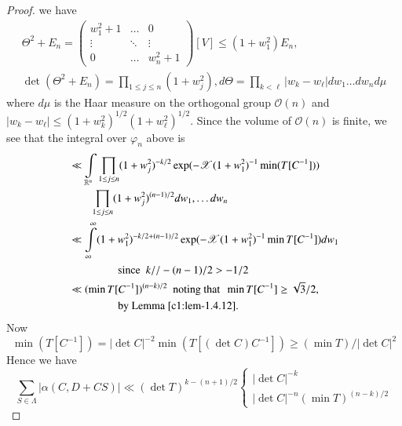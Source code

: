 \begin{proof}
we have
\begin{gather*}
\Theta^{2}+E_{n}=
\begin{pmatrix}
w^{2}_{1}+1 & \ldots & 0\\
\vdots & \ddots & \vdots\\
0 & \ldots & w^{2}_{n}+1
\end{pmatrix}
[V]\leq (1+w^{2}_{1})E_{n},\\
\det(\Theta^{2}+E_{n}) = \prod_{1\leq j\leq n}(1+w^{2}_{j}),
d\Theta=\prod\limits_{k<\ell}|w_{k}-w_{\ell}|dw_{1}\ldots dw_{n}d\mu
\end{gather*}
where $d\mu$ is the Haar measure on the orthogonal group
$\mathcal{O}(n)$ and $|w_{k}-w_{\ell}|\leq
(1+w^{2}_{k})^{1/2}(1+w^{2}_{\ell})^{1/2}$. Since the volume of
$\mathcal{O}(n)$ is finite, we see that the integral over
$\varphi_{n}$ above is 
\begin{align*}
&\ll \int\limits_{\mathbb{R}^{n}}\prod\limits_{1\leq j\leq
    n}(1+w^{2}_{j})^{-k/2}\exp(-\mathscr{X}(1+w^{2}_{1})^{-1}\min
  (T[C^{-1}]))\\
&\qquad\prod\limits_{1\leq j\leq
    n}(1+w^{2}_{j})^{(n-1)/2}dw_{1},\ldots dw_{n}\\
&\ll
  \int\limits^{\infty}_{\infty}(1+w^{2}_{1})^{-k/2+(n-1)/2}\exp(-\mathscr{X}(1+w^{2}_{1})^{-1}\min
  T[C^{-1}])dw_{1}\\
&\qquad\qquad\text{ \ since \ } k//-(n-1)/2>-1/2\\
&\ll (\min T[C^{-1}])^{(n-k)/2}\text{ \  noting that \ } \min
  T[C^{-1}]\geq \sqrt{3}/2,\\
&\qquad\qquad \text{ \ by Lemma \ref{c1:lem-1.4.12}.}
\end{align*}
Now
$$
\min(T[C^{-1}])=|\det C|^{-2}\min (T[(\det C)C^{-1}])\geq (\min
T)/|\det C|^{2}
$$
Hence we have
\begin{equation*}
\sum_{S\in \Lambda}|\alpha(C,D+CS)|\ll (\det T)^{k-(n+1)/2}
\begin{cases}
|\det C|^{-k}\\
|\det C|^{-n}(\min T)^{(n-k)/2}
\end{cases}\tag{39}
\end{equation*}
\end{proof}


